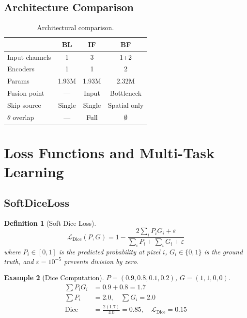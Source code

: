 \documentclass[10pt,twocolumn]{article}
\newtheorem{definition}{Definition}[section]
\newtheorem{example}[definition]{Example}
\begin{document}
\subsection{Architecture Comparison}

\begin{table}[H]
\centering
\caption{Architectural comparison.}
\label{tab:archcomp}
\begin{tabular}{lccc}
\toprule
& \textbf{BL} & \textbf{IF} & \textbf{BF} \\
\midrule
Input channels & 1 & 3 & 1+2 \\
Encoders & 1 & 1 & 2 \\
Params & 1.93M & 1.93M & 2.32M \\
Fusion point & --- & Input & Bottleneck \\
Skip source & Single & Single & Spatial only \\
$\theta$ overlap & --- & Full & $\emptyset$ \\
\bottomrule
\end{tabular}
\end{table}

\section{Loss Functions and Multi-Task Learning}

\subsection{SoftDiceLoss}

\begin{definition}[Soft Dice Loss]
\begin{equation}
\mathcal{L}_{\text{Dice}}(P, G) = 1 - \frac{2\sum_{i} P_i G_i + \varepsilon}{\sum_i P_i + \sum_i G_i + \varepsilon}
\end{equation}
where $P_i \in [0,1]$ is the predicted probability at pixel $i$, $G_i \in \{0,1\}$ is the ground truth, and $\varepsilon = 10^{-5}$ prevents division by zero.
\end{definition}

\begin{example}[Dice Computation]
$P = (0.9, 0.8, 0.1, 0.2)$, $G = (1, 1, 0, 0)$.
\begin{align*}
\sum P_i G_i &= 0.9 + 0.8 = 1.7 \\
\sum P_i &= 2.0, \quad \sum G_i = 2.0 \\
\text{Dice} &= \frac{2(1.7)}{4.0} = 0.85, \quad \mathcal{L}_{\text{Dice}} = 0.15
\end{align*}
\end{example}
\end{document}
